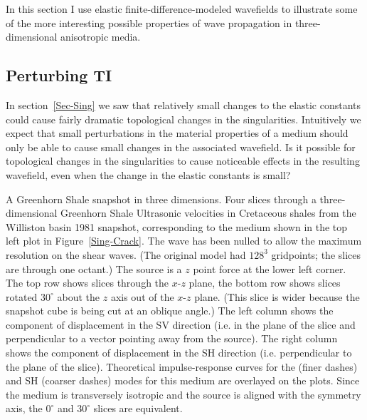In this section I use elastic finite-difference-modeled wavefields
to illustrate some of the more interesting possible properties of
wave propagation in three-dimensional anisotropic media.

\subsection{Perturbing TI}
\label{Exam3-PertTI}
In section~\ref{Sec-Sing} we saw that relatively small changes to the
elastic constants could cause fairly dramatic topological changes in
the singularities.
Intuitively we expect that small perturbations in the material properties
of a medium should only be able to cause small changes in the associated
wavefield.
Is it possible for topological changes in the singularities to cause
noticeable effects in the resulting wavefield,
even when the change in the elastic constants is small?

{A Greenhorn Shale snapshot in three dimensions.}
{
\small
Four slices through a three-dimensional Greenhorn Shale
{Ultrasonic velocities in Cretaceous shales from the Williston basin}
{1981} snapshot, corresponding to the medium shown in the top left plot
in Figure~\protect\ref{Sing-Crack}.
The {\qP} wave has been nulled to allow the maximum
resolution on the shear waves. (The original model had $128^3$ gridpoints;
the slices are through one octant.)
The source is a $z$ point force at the lower left corner.
The top row shows slices through the $x$-$z$ plane,
the bottom row shows slices rotated $30^\circ$ about the $z$ axis
out of the $x$-$z$ plane. (This slice is wider because the snapshot
cube is being cut at an oblique angle.)
The left column shows the component of displacement in the SV direction
(i.e. in the plane of the slice and
perpendicular to a vector pointing away from the source).
The right column shows the component of displacement in the SH direction
(i.e. perpendicular to the plane of the slice).
Theoretical impulse-response curves for the {\qSV} (finer dashes)
and SH (coarser dashes) modes for this medium are overlayed on the plots.
Since the medium is transversely isotropic and the source is aligned
with the symmetry axis, the $0^\circ$ and $30^\circ$ slices are equivalent.
}

